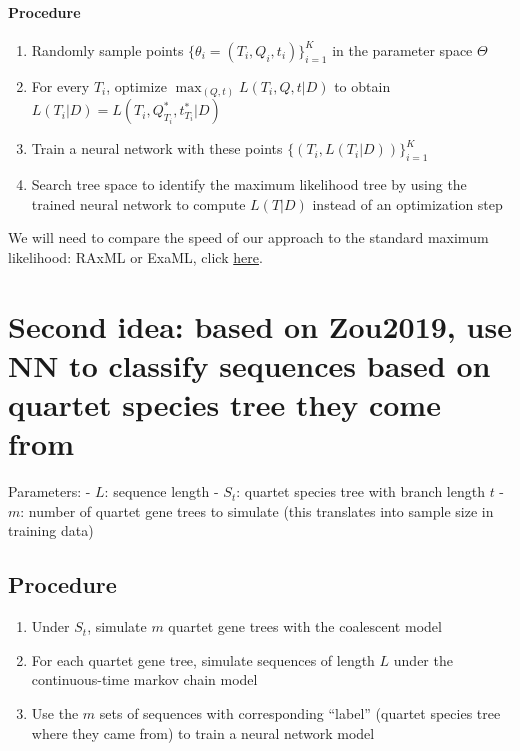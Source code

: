 \documentclass[]{article}
\providecommand{\tightlist}{%
  \setlength{\itemsep}{0pt}\setlength{\parskip}{0pt}}
\let\oldparagraph\paragraph
\renewcommand{\paragraph}[1]{\oldparagraph{#1}\mbox{}}
\begin{document}
\hypertarget{procedure}{%
\paragraph{Procedure}\label{procedure}}

\begin{enumerate}
\def\labelenumi{\arabic{enumi}.}
\tightlist
\item
  Randomly sample points \(\{\theta_i = (T_i,Q_i,t_i)\}_{i=1}^K\) in the
  parameter space \(\Theta\)
\item
  For every \(T_i\), optimize \(\max_{(Q,t)} L(T_i,Q,t|D)\) to obtain
  \(L(T_i|D) = L(T_i,Q^*_{T_i},t^*_{T_i}|D)\)
\item
  Train a neural network with these points
  \(\{(T_i, L(T_i|D))\}_{i=1}^K\)
\item
  Search tree space to identify the maximum likelihood tree by using the
  trained neural network to compute \(L(T|D)\) instead of an
  optimization step
\end{enumerate}

We will need to compare the speed of our approach to the standard
maximum likelihood: RAxML or ExaML, click
\href{https://cme.h-its.org/exelixis/software.html}{here}.

\pagebreak

\hypertarget{second-idea-based-on-zou2019-use-nn-to-classify-sequences-based-on-quartet-species-tree-they-come-from}{%
\section{Second idea: based on Zou2019, use NN to classify sequences
based on quartet species tree they come
from}\label{second-idea-based-on-zou2019-use-nn-to-classify-sequences-based-on-quartet-species-tree-they-come-from}}

Parameters: - \(L\): sequence length - \(S_t\): quartet species tree
with branch length \(t\) - \(m\): number of quartet gene trees to
simulate (this translates into sample size in training data)

\hypertarget{procedure-1}{%
\subsection{Procedure}\label{procedure-1}}

\begin{enumerate}
\def\labelenumi{\arabic{enumi}.}
\tightlist
\item
  Under \(S_t\), simulate \(m\) quartet gene trees with the coalescent
  model
\item
  For each quartet gene tree, simulate sequences of length \(L\) under
  the continuous-time markov chain model
\item
  Use the \(m\) sets of sequences with corresponding ``label'' (quartet
  species tree where they came from) to train a neural network model
\end{enumerate}


\end{document}
